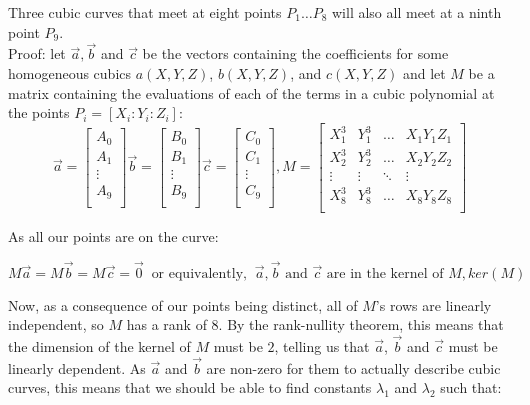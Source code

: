 \documentclass{article}
\begin{document}
Three cubic curves that meet at eight points $P_1 \dots P_8$ will also all meet at a ninth point $P_9$.\\

Proof: let $\vec{a}, \vec{b}$ and $\vec{c}$ be the vectors containing the coefficients for some homogeneous cubics $a(X, Y, Z)$, $b(X, Y, Z)$, and $c(X, Y, Z)$ and let $M$ be a matrix containing the evaluations of each of the terms in a cubic polynomial at the points $P_i = [X_i : Y_i : Z_i]$:\\

\[ \vec{a} = 
\begin{bmatrix}
A_0 \\
A_1 \\
\vdots\\
A_9\\
\end{bmatrix} 
\vec{b} =
\begin{bmatrix}
B_0 \\
B_1 \\
\vdots\\
B_9\\
\end{bmatrix} 
\vec{c} = 
\begin{bmatrix}
C_0 \\
C_1 \\
\vdots\\
C_9\\
\end{bmatrix} ,
M = 
\begin{bmatrix}
X_1^3  & Y_1^3  & \dots  & X_1 Y_1 Z_1 \\
X_2^3  & Y_2^3  & \dots  & X_2 Y_2 Z_2 \\
\vdots & \vdots & \ddots & \vdots\\
X_8^3  & Y_8^3  & \dots  & X_8 Y_8 Z_8 \\
\end{bmatrix} 
\]

As all our points are on the curve:

\[M\vec{a} = M\vec{b} = M\vec{c} = \vec{0} \ \text{ or equivalently, } \ \vec{a}, \vec{b} \text{ and } \vec{c} \text{ are in the kernel of }M,  ker(M) \]

Now, as a consequence of our points being distinct, all of $M$'s rows are linearly independent, so $M$ has a rank of $8$. By the rank-nullity theorem, this means that the dimension of the kernel of $M$ must be $2$, telling us that $\vec{a}$, $\vec{b}$ and $\vec{c}$ must be linearly dependent. As $\vec{a}$ and $\vec{b}$ are non-zero for them to actually describe cubic curves, this means that we should be able to find constants $\lambda_1$ and $\lambda_2$ such that:\\
\end{document}
